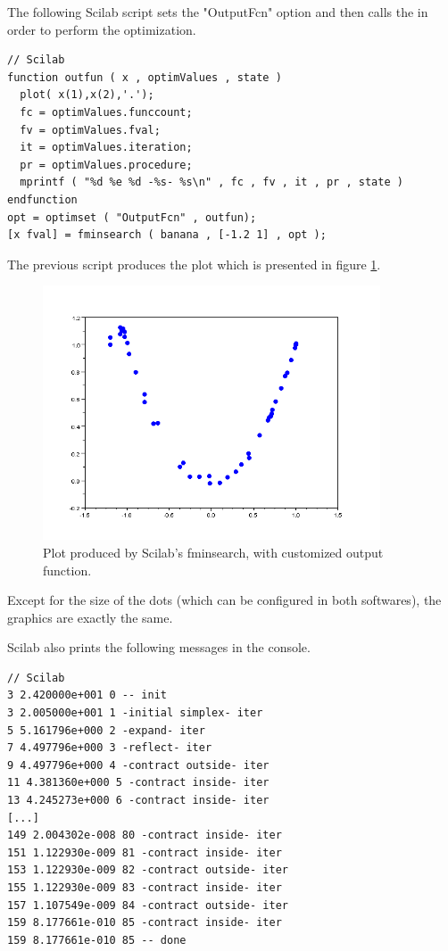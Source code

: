 The following Scilab script sets the "OutputFcn" option and then calls 
the  in order to perform the optimization.

\lstset{language=scilabscript}
\begin{lstlisting}
// Scilab
function outfun ( x , optimValues , state )
  plot( x(1),x(2),'.');
  fc = optimValues.funccount;
  fv = optimValues.fval;
  it = optimValues.iteration;
  pr = optimValues.procedure;
  mprintf ( "%d %e %d -%s- %s\n" , fc , fv , it , pr , state )
endfunction
opt = optimset ( "OutputFcn" , outfun);
[x fval] = fminsearch ( banana , [-1.2 1] , opt );
\end{lstlisting}

The previous script produces the plot which is presented 
in figure \ref{fig-fminsearch-scilab-outputfun}.

\begin{figure}
\begin{center}
\includegraphics[width=10cm]{testFminsearchPlotScilab.png}
\end{center}
\caption{Plot produced by Scilab's fminsearch, with customized output function.}
\label{fig-fminsearch-scilab-outputfun}
\end{figure}

Except for the size of the dots (which can be configured in 
both softwares), the graphics are exactly the same.

Scilab also prints the following messages in the console.

\lstset{language=scilabscript}
\begin{lstlisting}
// Scilab
3 2.420000e+001 0 -- init
3 2.005000e+001 1 -initial simplex- iter
5 5.161796e+000 2 -expand- iter
7 4.497796e+000 3 -reflect- iter
9 4.497796e+000 4 -contract outside- iter
11 4.381360e+000 5 -contract inside- iter
13 4.245273e+000 6 -contract inside- iter
[...]
149 2.004302e-008 80 -contract inside- iter
151 1.122930e-009 81 -contract inside- iter
153 1.122930e-009 82 -contract outside- iter
155 1.122930e-009 83 -contract inside- iter
157 1.107549e-009 84 -contract outside- iter
159 8.177661e-010 85 -contract inside- iter
159 8.177661e-010 85 -- done
\end{lstlisting}

